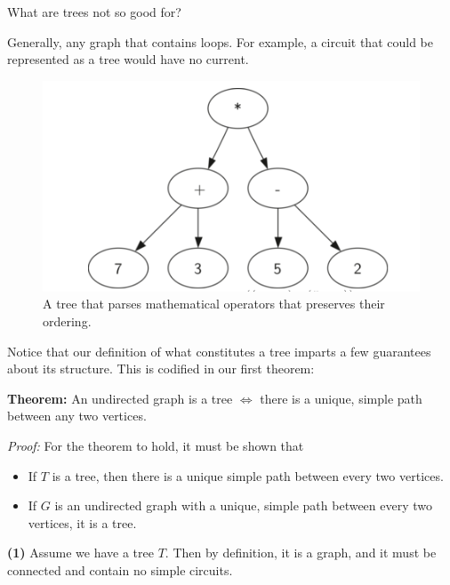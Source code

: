 \documentclass[a4paper,10pt]{report}
\begin{document}
What are trees not so good for?

Generally, any graph that contains loops. For example, a circuit that could be represented as a tree would have no current.

\begin{figure}[h!]
	\begin{centering}
	\begin{center}
	\includegraphics[width=\linewidth]{./parse_tree.png}
	\caption{A tree that parses mathematical operators that preserves their ordering.}
	\label{fig:parse}
	\end{center}
	\par\end{centering}
\end{figure}



Notice that our definition of what constitutes a tree imparts a few guarantees about its structure. This is codified in our first theorem:

\hrulefill

\noindent\textbf{Theorem: }An undirected graph is a tree $\iff$ there is a unique, simple path between any two vertices.

\textit{Proof:} For the theorem to hold, it must be shown that
\begin{itemize}
	\item If $T$ is a tree, then there is a unique simple path between every two vertices.
	\item If $G$ is an undirected graph with a unique, simple path between every two vertices, it is a tree.
\end{itemize}

\textbf{(1)} Assume we have a tree $T$.
Then by definition, it is a graph, and it must be connected and contain no simple circuits.
\end{document}
